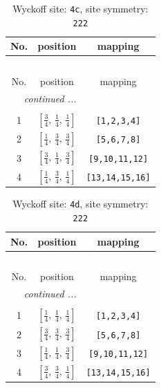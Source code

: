 \documentclass[fleqn,8pt]{jsarticle}
\begin{document}
\renewcommand{\arraystretch}{1.2}
\begin{longtable}{ccc}
\caption{Wyckoff site: {\tt 4c}, site symmetry: {\tt 222}}
 \\
 \hline \hline
No. & position & mapping \\ \hline \endfirsthead

\multicolumn{2}{l}{\tablename\ \thetable{}} \\
 \hline \hline
No. & position & mapping \\ \hline \endhead

 \hline \hline
\multicolumn{2}{r}{\footnotesize\it continued ...} \\ \endfoot

 \hline \hline
\multicolumn{2}{r}{} \\ \endlastfoot

1 & $\left[ \frac{3}{4},\, \frac{1}{4},\, \frac{1}{4} \right]$ & {\tt [1,2,3,4]} \\ \hline
2 & $\left[ \frac{1}{4},\, \frac{3}{4},\, \frac{3}{4} \right]$ & {\tt [5,6,7,8]} \\ \hline
3 & $\left[ \frac{3}{4},\, \frac{1}{4},\, \frac{3}{4} \right]$ & {\tt [9,10,11,12]} \\ \hline
4 & $\left[ \frac{1}{4},\, \frac{3}{4},\, \frac{1}{4} \right]$ & {\tt [13,14,15,16]} \\
\end{longtable}
\renewcommand{\arraystretch}{1.2}
\begin{longtable}{ccc}
\caption{Wyckoff site: {\tt 4d}, site symmetry: {\tt 222}}
 \\
 \hline \hline
No. & position & mapping \\ \hline \endfirsthead

\multicolumn{2}{l}{\tablename\ \thetable{}} \\
 \hline \hline
No. & position & mapping \\ \hline \endhead

 \hline \hline
\multicolumn{2}{r}{\footnotesize\it continued ...} \\ \endfoot

 \hline \hline
\multicolumn{2}{r}{} \\ \endlastfoot

1 & $\left[ \frac{1}{4},\, \frac{1}{4},\, \frac{1}{4} \right]$ & {\tt [1,2,3,4]} \\ \hline
2 & $\left[ \frac{3}{4},\, \frac{3}{4},\, \frac{3}{4} \right]$ & {\tt [5,6,7,8]} \\ \hline
3 & $\left[ \frac{1}{4},\, \frac{1}{4},\, \frac{3}{4} \right]$ & {\tt [9,10,11,12]} \\ \hline
4 & $\left[ \frac{3}{4},\, \frac{3}{4},\, \frac{1}{4} \right]$ & {\tt [13,14,15,16]} \\
\end{longtable}
\end{document}
